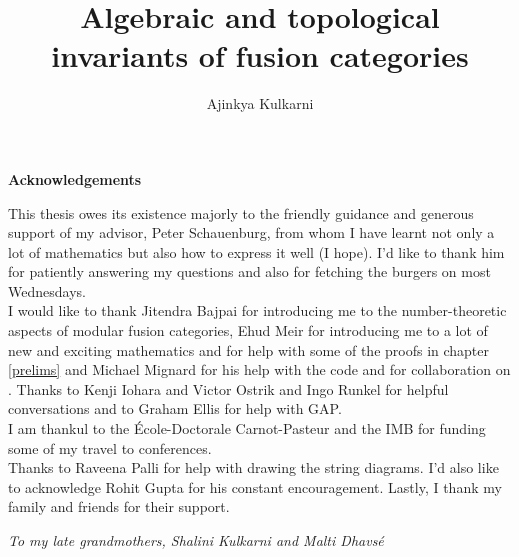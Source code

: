 \documentclass[a4paper, 10pt]{book}
\title{Algebraic and topological invariants of fusion categories}
\author{Ajinkya Kulkarni}
\makeatletter
\theoremstyle{definition}
\numberwithin{equation}{chapter}
\newcommand\ackname{Acknowledgements}
\newenvironment{acknowledgements}{%
       \titlepage
       \null\vfil
       \@beginparpenalty\@lowpenalty
       \begin{center}%
         \bfseries \ackname
         \@endparpenalty\@M
       \end{center}}%
      {\par\vfil\null\endtitlepage}
\newenvironment{acknowledgements}{%
       \if@twocolumn
         \section*{\abstractname}%
       \else
         \small
         \begin{center}%
           {\bfseries \ackname\vspace{-.5em}\vspace{\z@}}%
         \end{center}%
         \quotation
       \fi}
       {\if@twocolumn\else\endquotation\fi}
\makeatother
\begin{document}

\maketitle

\begin{acknowledgements}

\thispagestyle{plain}
This thesis owes its existence majorly to the friendly guidance and generous support of my advisor, Peter Schauenburg, from whom I have learnt not only a lot of mathematics but also how to express it well (I hope). I'd like to thank him for patiently answering my questions and also for fetching the burgers on most Wednesdays.\\
I would like to thank Jitendra Bajpai for introducing me to the number-theoretic aspects of modular fusion categories, Ehud Meir for introducing me to a lot of new and exciting mathematics and for help with some of the proofs in chapter \ref{prelims} and Michael Mignard for his help with the code and for collaboration on \cite{kulkarni2018topological}. Thanks to Kenji Iohara and Victor Ostrik and Ingo Runkel for helpful conversations and to Graham Ellis for help with GAP. \\
I am thankul to the \'Ecole-Doctorale Carnot-Pasteur and the IMB for funding some of my travel to conferences. \\
Thanks to Raveena Palli for help with drawing the string diagrams. I'd also like to acknowledge Rohit Gupta for his constant encouragement.  Lastly, I thank my family and friends for their support.
\end{acknowledgements}

  \clearpage
\begin{center}
    \thispagestyle{empty}
    \vspace*{\fill}
    \textit{To my late grandmothers, Shalini Kulkarni and Malti Dhavs\'e}
    \vspace*{\fill}
\end{center}
\clearpage
\tableofcontents
\end{document}
